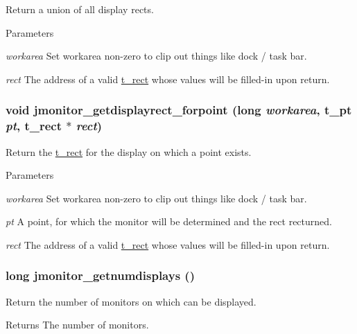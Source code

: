 Return a union of all display rects. 
\begin{DoxyParams}{Parameters}
\item[{\em workarea}]Set workarea non-\/zero to clip out things like dock / task bar. \item[{\em rect}]The address of a valid \hyperlink{structt__rect}{t\_\-rect} whose values will be filled-\/in upon return. \end{DoxyParams}
\hypertarget{group__jmonitor_ga354f8b2efda018ec3ff2a609205a74a0}{
\subsubsection[{jmonitor\_\-getdisplayrect\_\-forpoint}]{\setlength{\rightskip}{0pt plus 5cm}void jmonitor\_\-getdisplayrect\_\-forpoint (long {\em workarea}, \/  {\bf t\_\-pt} {\em pt}, \/  {\bf t\_\-rect} $\ast$ {\em rect})}}
\label{group__jmonitor_ga354f8b2efda018ec3ff2a609205a74a0}


Return the \hyperlink{structt__rect}{t\_\-rect} for the display on which a point exists. 
\begin{DoxyParams}{Parameters}
\item[{\em workarea}]Set workarea non-\/zero to clip out things like dock / task bar. \item[{\em pt}]A point, for which the monitor will be determined and the rect recturned. \item[{\em rect}]The address of a valid \hyperlink{structt__rect}{t\_\-rect} whose values will be filled-\/in upon return. \end{DoxyParams}
\hypertarget{group__jmonitor_ga2bd6c2e27e9ac7bfdd05cbf815ef1082}{
\subsubsection[{jmonitor\_\-getnumdisplays}]{\setlength{\rightskip}{0pt plus 5cm}long jmonitor\_\-getnumdisplays ()}}
\label{group__jmonitor_ga2bd6c2e27e9ac7bfdd05cbf815ef1082}


Return the number of monitors on which can be displayed. \begin{DoxyReturn}{Returns}
The number of monitors. 
\end{DoxyReturn}
